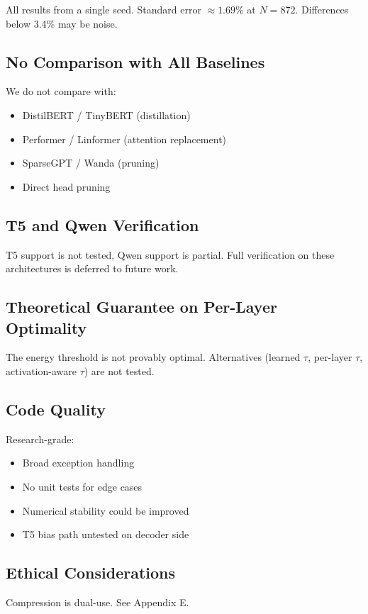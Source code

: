 All results from a single seed. Standard error $\approx 1.69\%$ at $N = 872$. 
Differences below 3.4\% may be noise.

\subsection{No Comparison with All Baselines}

We do not compare with:
\begin{itemize}
\item DistilBERT / TinyBERT (distillation)
\item Performer / Linformer (attention replacement)
\item SparseGPT / Wanda (pruning)
\item Direct head pruning

\end{itemize}
\subsection{T5 and Qwen Verification}

T5 support is not tested, Qwen support is partial. Full 
verification on these architectures is deferred to future work.

\subsection{Theoretical Guarantee on Per-Layer Optimality}

The energy threshold is not provably optimal. Alternatives (learned $\tau$, 
per-layer $\tau$, activation-aware $\tau$) are not tested.

\subsection{Code Quality}

Research-grade:
\begin{itemize}
\item Broad exception handling
\item No unit tests for edge cases
\item Numerical stability could be improved
\item T5 bias path untested on decoder side

\end{itemize}
\subsection{Ethical Considerations}

Compression is dual-use. See Appendix E.